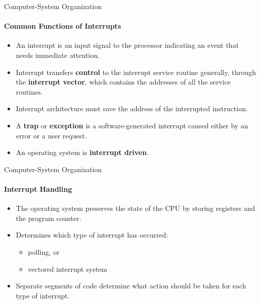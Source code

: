 \documentclass[10pt]{beamer}
\begin{document}
\begin{frame}{Computer-System Organization}
\framesubtitle{Common Functions of Interrupts}
\begin{itemize}
\item An interrupt is an input signal to the processor indicating an event that needs immediate attention.
\item Interrupt transfers \textbf{control} to the interrupt service routine generally, through the \textbf{\alert{interrupt vector}}, which contains the addresses of all the service routines.
\item Interrupt architecture must save the address of the interrupted instruction.
\item A \textbf{\alert{trap}} or \textbf{\alert{exception}} is a software-generated interrupt caused either by an error or a user request.
\item An operating system is \textbf{\alert{interrupt driven}}.
\end{itemize}
\end{frame}

\begin{frame}{Computer-System Organization}
\framesubtitle{Interrupt Handling}
\begin{itemize}
\item The operating system preserves the state of the CPU by storing registers and the program counter.
\item Determines which type of interrupt has occurred:
\begin{itemize}
\item \alert{polling}, or
\item \alert{vectored} interrupt system
\end{itemize}
\item Separate segments of code determine what action should be taken for each type of interrupt.
\end{itemize}
\end{frame}

\end{document}

